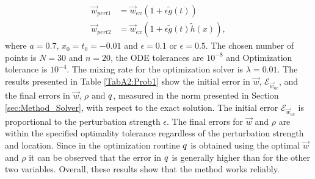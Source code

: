 \begin{align*}
\vec{w}_{pert1} &= \vec{w}_{ex}(1+ \epsilon \tilde g(t))\\
\vec{w}_{pert2} &= \vec{w}_{ex}(1+ \epsilon \tilde g(t) \tilde h(x)),
\end{align*}
where $a = 0.7$, $x_0 = t_0 = -0.01$ and $\epsilon = 0.1$ or $\epsilon = 0.5$.
The chosen number of points is $N =30$ and $n=20$, the ODE tolerances are $10^{-8}$ and Optimization tolerance is $10^{-4}$. The mixing rate for the optimization solver is $\lambda = 0.01$.
The results presented in Table \ref{TabA2:Prob1} show the initial error in $\vec{w}$, $\mathcal{E}_{\vec{w}_{uc}}$, and the final errors in $\vec{w}$, $\rho$ and $q$, measured in the norm presented in Section \ref{sec:Method_Solver}, with respect to the exact solution. The initial error $\mathcal{E}_{\vec{w}_{uc}}$ is proportional to the perturbation strength $\epsilon$. The final errors for $\vec{w}$ and $\rho$ are within the specified optimality tolerance regardless of the perturbation strength and location. Since in the optimization routine $q$ is obtained using the optimal $\vec{w}$ and $\rho$ it can be observed that the error in $q$ is generally higher than for the other two variables. Overall, these results show that the method works reliably.


